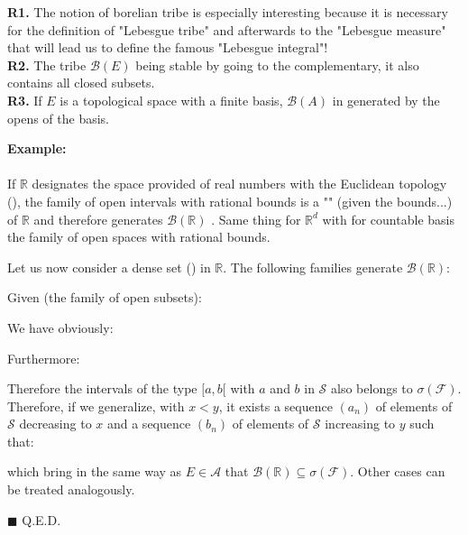 	\begin{tcolorbox}[title=Remarks,colframe=black,arc=10pt]
	\textbf{R1.} The notion of borelian tribe is especially interesting because it is necessary for the definition of "Lebesgue tribe" and afterwards to the "Lebesgue measure" that will lead us to define the  famous "Lebesgue integral"!\\
	
	\textbf{R2.} The tribe $\mathcal{B}(E)$ being stable by going to the complementary, it also contains all closed subsets.\\
	
	\textbf{R3.} If $E$ is a topological space with a finite basis, $\mathcal{B}(A)$ in generated by the opens of the basis.
	\end{tcolorbox}	
	\begin{tcolorbox}[colframe=black,colback=white,sharp corners]
	\textbf{{\Large {}}Example:}\\\\
	If $\mathbb{R}$ designates the space provided of real numbers with the Euclidean topology (), the family of open intervals with rational bounds is a "" (given the bounds...) of $\mathbb{R}$ and therefore generates $\mathcal{B}(\mathbb{R})$ . Same thing for $\mathbb{R}^d$ with for countable basis the family of open spaces with rational bounds.
	\end{tcolorbox}
	\begin{theorem}
	Let us now consider a dense set () in $\mathbb{R}$. The following families generate $\mathcal{B}(\mathbb{R})$:
	
	\end{theorem}
	\begin{dem}
	Given (the family of open subsets):
	
	We have obviously:
	
	Furthermore:
	
	Therefore the intervals of the type $[a,b[$ with $a$ and $b$ in $\mathcal{S}$ also belongs to $\sigma(\mathcal{F})$. Therefore, if we generalize, with $x<y$, it exists a sequence $(a_n)$ of elements of $\mathcal{S}$ decreasing to $x$ and a sequence $(b_n)$ of elements of $\mathcal{S}$ increasing to $y$ such that:
	
	which bring in the same way as $E\in \mathcal{A}$ that $\mathcal{B}(\mathbb{R})\subseteq\sigma(\mathcal{F})$. Other cases can be treated analogously.
	\begin{flushright}
		$\blacksquare$  Q.E.D.
	\end{flushright}
	\end{dem}
